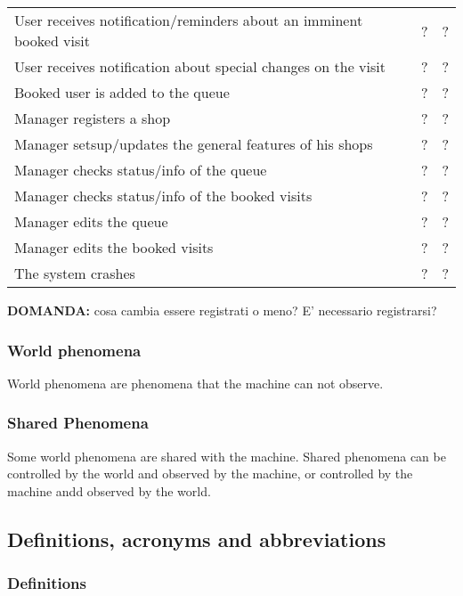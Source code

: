 \begin{tabular}{|l|c|c|}
    User receives notification/reminders about an imminent booked visit & ? & ? \\
    User receives notification about special changes on the visit & ? & ? \\
    Booked user is added to the queue & ? & ? \\ %
    \hline
    Manager registers a shop & ? & ? \\
    Manager setsup/updates the general features of his shops & ? & ? \\
    Manager checks status/info of the queue & ? & ? \\
    Manager checks status/info of the booked visits & ? & ? \\
    Manager edits the queue & ? & ? \\
    Manager edits the booked visits & ? & ? \\
    \hline
    The system crashes & ? & ? \\
    \hline
\end{tabular}

\textbf{DOMANDA:} cosa cambia essere registrati o meno? E' necessario registrarsi?

\subsubsection{World phenomena}
\label{subsubsect:worldphenomena}

World phenomena are phenomena that the machine can not observe.

\subsubsection{Shared Phenomena}
\label{subsubsect:sharedphenomena}

Some world phenomena are shared with the machine.
Shared phenomena can be controlled by the world and observed by the machine, or controlled by the machine andd observed by the world.

\subsection{Definitions, acronyms and abbreviations}
\label{subsect:definitionsacronymsabbreviations}

\subsubsection{Definitions}
\label{subsect:definitions}

